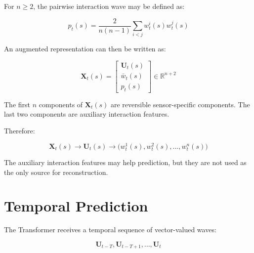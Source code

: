 \documentclass[a4paper]{article}
\begin{document}
        For \(n \geq 2\), the pairwise interaction wave may be defined as:
        
        \begin{equation}
            p_t(s)
            =
            \frac{2}{n(n-1)}
            \sum_{i<j}
            w_t^i(s)
            w_t^j(s)
        \end{equation}
        
        An augmented representation can then be written as:
        
        \begin{equation}
            \mathbf{X}_t(s)
            =
            \begin{bmatrix}
                \mathbf{U}_t(s)
                \\
                \bar{w}_t(s)
                \\
                p_t(s)
            \end{bmatrix}
            \in
            \mathbb{R}^{n+2}
        \end{equation}
        
        The first \(n\) components of \(\mathbf{X}_t(s)\) are reversible sensor-specific components.
        The last two components are auxiliary interaction features.
        
        Therefore:
        
        \begin{equation}
            \mathbf{X}_t(s)
            \longrightarrow
            \mathbf{U}_t(s)
            \longrightarrow
            \bigl(
            w_t^1(s),
            w_t^2(s),
            \ldots,
            w_t^n(s)
            \bigr)
        \end{equation}
        
        The auxiliary interaction features may help prediction, but they are not used as the only source for reconstruction.
    
    
    \section{Temporal Prediction}
        
        The Transformer receives a temporal sequence of vector-valued waves:
        
        \begin{equation}
            \mathbf{U}_{t-T},
            \mathbf{U}_{t-T+1},
            \ldots,
            \mathbf{U}_{t}
        \end{equation}
        
\end{document}
